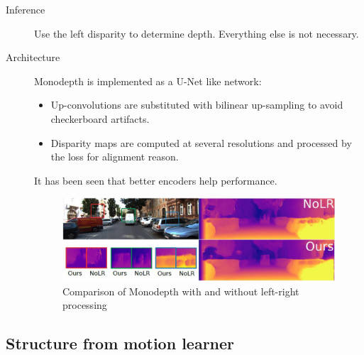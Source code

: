 \begin{description}
\begin{description}
            \item[Inference]
                Use the left disparity to determine depth. Everything else is not necessary.

            \item[Architecture]
                Monodepth is implemented as a U-Net like network:
                \begin{itemize}
                    \item Up-convolutions are substituted with bilinear up-sampling to avoid checkerboard artifacts.
                    \item Disparity maps are computed at several resolutions and processed by the loss for alignment reason.
                \end{itemize}

                \begin{remark}
                    It has been seen that better encoders help performance.
                \end{remark}

            \begin{figure}[H]
                \centering
                \includegraphics[width=0.7\linewidth]{./img/monodepth_lr_results.png}
                \caption{Comparison of Monodepth with and without left-right processing}
            \end{figure}
        \end{description}
    \end{description}


\subsection{Structure from motion learner}

